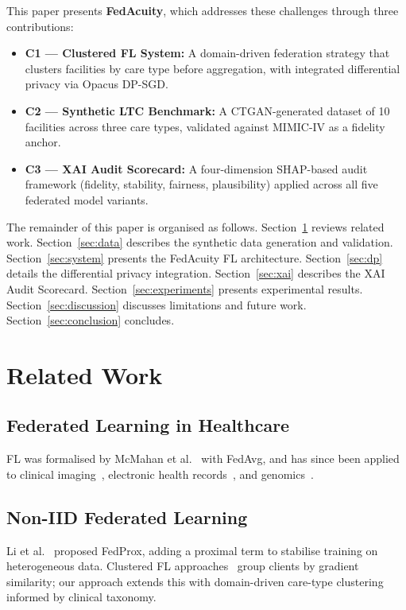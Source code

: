 \documentclass[journal]{IEEEtran}
\begin{document}
This paper presents \textbf{FedAcuity}, which addresses these challenges
through three contributions:

\begin{itemize}
  \item \textbf{C1 — Clustered FL System:} A domain-driven federation strategy
  that clusters facilities by care type before aggregation, with integrated
  differential privacy via Opacus DP-SGD.
  \item \textbf{C2 — Synthetic LTC Benchmark:} A CTGAN-generated dataset of 10
  facilities across three care types, validated against MIMIC-IV as a fidelity
  anchor.
  \item \textbf{C3 — XAI Audit Scorecard:} A four-dimension SHAP-based audit
  framework (fidelity, stability, fairness, plausibility) applied across all
  five federated model variants.
\end{itemize}

The remainder of this paper is organised as follows.
Section~\ref{sec:related} reviews related work.
Section~\ref{sec:data} describes the synthetic data generation and validation.
Section~\ref{sec:system} presents the FedAcuity FL architecture.
Section~\ref{sec:dp} details the differential privacy integration.
Section~\ref{sec:xai} describes the XAI Audit Scorecard.
Section~\ref{sec:experiments} presents experimental results.
Section~\ref{sec:discussion} discusses limitations and future work.
Section~\ref{sec:conclusion} concludes.

\section{Related Work}
\label{sec:related}

\subsection{Federated Learning in Healthcare}
FL was formalised by McMahan et al.~\cite{mcmahan2017} with FedAvg, and has
since been applied to clinical imaging~\cite{rieke2020}, electronic health
records~\cite{brisimi2018}, and genomics~\cite{chen2020}.

\subsection{Non-IID Federated Learning}
Li et al.~\cite{li2020fedprox} proposed FedProx, adding a proximal term to
stabilise training on heterogeneous data. Clustered FL approaches~\cite{sattler2020}
group clients by gradient similarity; our approach extends this with
domain-driven care-type clustering informed by clinical taxonomy.
\end{document}
